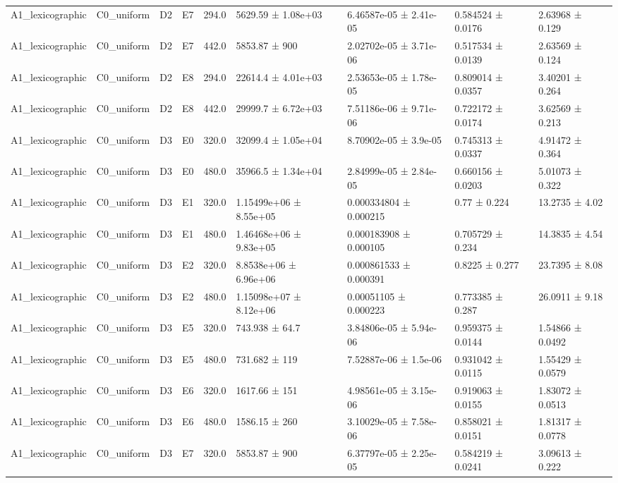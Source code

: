 \begin{table}
\begin{tabular}{lllllllll}
A1\_lexicographic & C0\_uniform & D2 & E7 & 294.0 & 5629.59 ± 1.08e+03 & 6.46587e-05 ± 2.41e-05 & 0.584524 ± 0.0176 & 2.63968 ± 0.129 \\
A1\_lexicographic & C0\_uniform & D2 & E7 & 442.0 & 5853.87 ± 900 & 2.02702e-05 ± 3.71e-06 & 0.517534 ± 0.0139 & 2.63569 ± 0.124 \\
A1\_lexicographic & C0\_uniform & D2 & E8 & 294.0 & 22614.4 ± 4.01e+03 & 2.53653e-05 ± 1.78e-05 & 0.809014 ± 0.0357 & 3.40201 ± 0.264 \\
A1\_lexicographic & C0\_uniform & D2 & E8 & 442.0 & 29999.7 ± 6.72e+03 & 7.51186e-06 ± 9.71e-06 & 0.722172 ± 0.0174 & 3.62569 ± 0.213 \\
A1\_lexicographic & C0\_uniform & D3 & E0 & 320.0 & 32099.4 ± 1.05e+04 & 8.70902e-05 ± 3.9e-05 & 0.745313 ± 0.0337 & 4.91472 ± 0.364 \\
A1\_lexicographic & C0\_uniform & D3 & E0 & 480.0 & 35966.5 ± 1.34e+04 & 2.84999e-05 ± 2.84e-05 & 0.660156 ± 0.0203 & 5.01073 ± 0.322 \\
A1\_lexicographic & C0\_uniform & D3 & E1 & 320.0 & 1.15499e+06 ± 8.55e+05 & 0.000334804 ± 0.000215 & 0.77 ± 0.224 & 13.2735 ± 4.02 \\
A1\_lexicographic & C0\_uniform & D3 & E1 & 480.0 & 1.46468e+06 ± 9.83e+05 & 0.000183908 ± 0.000105 & 0.705729 ± 0.234 & 14.3835 ± 4.54 \\
A1\_lexicographic & C0\_uniform & D3 & E2 & 320.0 & 8.8538e+06 ± 6.96e+06 & 0.000861533 ± 0.000391 & 0.8225 ± 0.277 & 23.7395 ± 8.08 \\
A1\_lexicographic & C0\_uniform & D3 & E2 & 480.0 & 1.15098e+07 ± 8.12e+06 & 0.00051105 ± 0.000223 & 0.773385 ± 0.287 & 26.0911 ± 9.18 \\
A1\_lexicographic & C0\_uniform & D3 & E5 & 320.0 & 743.938 ± 64.7 & 3.84806e-05 ± 5.94e-06 & 0.959375 ± 0.0144 & 1.54866 ± 0.0492 \\
A1\_lexicographic & C0\_uniform & D3 & E5 & 480.0 & 731.682 ± 119 & 7.52887e-06 ± 1.5e-06 & 0.931042 ± 0.0115 & 1.55429 ± 0.0579 \\
A1\_lexicographic & C0\_uniform & D3 & E6 & 320.0 & 1617.66 ± 151 & 4.98561e-05 ± 3.15e-06 & 0.919063 ± 0.0155 & 1.83072 ± 0.0513 \\
A1\_lexicographic & C0\_uniform & D3 & E6 & 480.0 & 1586.15 ± 260 & 3.10029e-05 ± 7.58e-06 & 0.858021 ± 0.0151 & 1.81317 ± 0.0778 \\
A1\_lexicographic & C0\_uniform & D3 & E7 & 320.0 & 5853.87 ± 900 & 6.37797e-05 ± 2.25e-05 & 0.584219 ± 0.0241 & 3.09613 ± 0.222 \\

\end{tabular}
\end{table}
